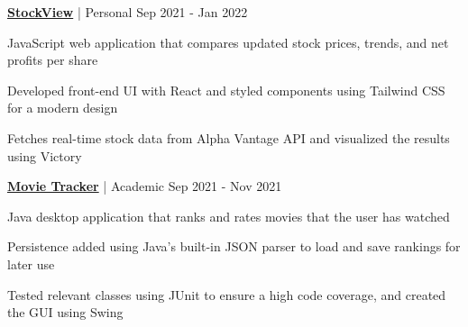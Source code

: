 \documentclass[a4paper,11pt]{article}
\begin{document}
\vspace{0.25cm}

\href{https://github.com/aaronchan73/stockview}{\textbf{StockView}} | Personal
\hfill {Sep 2021 - Jan 2022}
\begin{innerlist}
\item JavaScript web application that compares updated stock prices, trends, and net profits per share
\item Developed front-end UI with React and styled components using Tailwind CSS for a modern design
\item Fetches real-time stock data from Alpha Vantage API and visualized the results using Victory
\end{innerlist}

\vspace{0.25cm}



\href{https://github.com/aaronchan73/movie-tracker}{\textbf{Movie Tracker}} | Academic
\hfill {Sep 2021 - Nov 2021}
\begin{innerlist}
\item Java desktop application that ranks and rates movies that the user has watched
\item Persistence added using Java's built-in JSON parser to load and save rankings for later use
\item Tested relevant classes using JUnit to ensure a high code coverage, and created the GUI using Swing
\end{innerlist}


\end{document}
